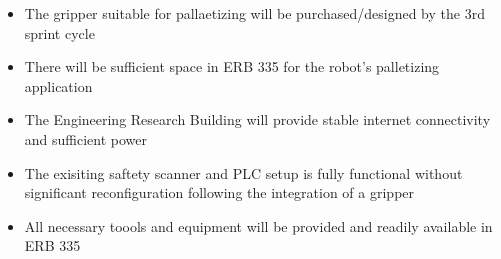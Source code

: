 \begin{itemize}
  \item The gripper suitable for pallaetizing will be purchased/designed by the 3rd sprint cycle 
  \item There will be sufficient space in ERB 335 for the robot's palletizing application
  \item The Engineering Research Building will provide stable internet connectivity and sufficient power 
  \item The exisiting saftety scanner and PLC setup is fully functional without significant reconfiguration following the integration of a gripper
  \item All necessary toools and equipment will be provided and readily available in ERB 335
\end{itemize}